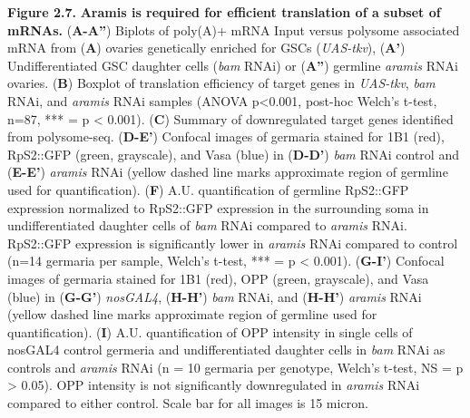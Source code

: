 \documentclass[12pt,oneside]{reedthesis}
\begin{document}
\textbf{\hfill\break
}

\textbf{Figure 2.7.} \textbf{Aramis is required for efficient translation of a subset
of mRNAs.} (\textbf{A-A''}) Biplots of poly(A)+ mRNA Input versus polysome
associated mRNA from (\textbf{A}) ovaries genetically enriched for GSCs
(\emph{UAS-tkv}), (\textbf{A'}) Undifferentiated GSC daughter cells (\emph{bam} RNAi)
or (\textbf{A''}) germline \emph{aramis} RNAi ovaries. (\textbf{B}) Boxplot of
translation efficiency of target genes in \emph{UAS-tkv}, \emph{bam} RNAi, and
\emph{aramis} RNAi samples (ANOVA p\textless0.001, post-hoc Welch's t-test, n=87,
*** = p \textless{} 0.001). (\textbf{C}) Summary of downregulated target genes
identified from polysome-seq. (\textbf{D-E'}) Confocal images of germaria
stained for 1B1 (red), RpS2::GFP (green, grayscale), and Vasa (blue) in
(\textbf{D-D'}) \emph{bam} RNAi control and (\textbf{E-E'}) \emph{aramis} RNAi (yellow
dashed line marks approximate region of germline used for
quantification). (\textbf{F}) A.U. quantification of germline RpS2::GFP
expression normalized to RpS2::GFP expression in the surrounding soma in
undifferentiated daughter cells of \emph{bam} RNAi compared to \emph{aramis} RNAi.
RpS2::GFP expression is significantly lower in \emph{aramis} RNAi compared to
control (n=14 germaria per sample, Welch's t-test, *** = p \textless{} 0.001).
(\textbf{G-I'}) Confocal images of germaria stained for 1B1 (red), OPP
(green, grayscale), and Vasa (blue) in (\textbf{G-G'}) \emph{nosGAL4}, (\textbf{H-H'})
\emph{bam} RNAi, and (\textbf{H-H'}) \emph{aramis} RNAi (yellow dashed line marks
approximate region of germline used for quantification). (\textbf{I}) A.U.
quantification of OPP intensity in single cells of nosGAL4 control
germeria and undifferentiated daughter cells in \emph{bam} RNAi as controls
and \emph{aramis} RNAi (n = 10 germaria per genotype, Welch's t-test, NS = p
\textgreater{} 0.05). OPP intensity is not significantly downregulated in \emph{aramis}
RNAi compared to either control. Scale bar for all images is 15 micron.

\textbf{\hfill\break
}
\end{document}

